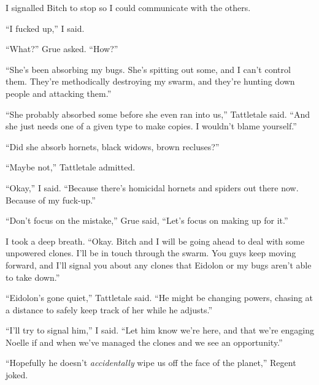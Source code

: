 





I signalled Bitch to stop so I could communicate with the others.



``I fucked up,'' I said.



``What?''  Grue asked.  ``How?''



``She's been absorbing my bugs.  She's spitting out some, and I can't control them.  They're methodically destroying my swarm, and they're hunting down people and attacking them.''



``She probably absorbed some before she even ran into us,'' Tattletale said.  ``And she just needs one of a given type to make copies.  I wouldn't blame yourself.''



``Did she absorb hornets, black widows, brown recluses?''



``Maybe not,'' Tattletale admitted.



``Okay,'' I said.  ``Because there's homicidal hornets and spiders out there now.  Because of my fuck-up.''



``Don't focus on the mistake,'' Grue said, ``Let's focus on making up for it.''



I took a deep breath.  ``Okay.  Bitch and I will be going ahead to deal with some unpowered clones.  I'll be in touch through the swarm.  You guys keep moving forward, and I'll signal you about any clones that Eidolon or my bugs aren't able to take down.''



``Eidolon's gone quiet,'' Tattletale said.  ``He might be changing powers, chasing at a distance to safely keep track of her while he adjusts.''



``I'll try to signal him,'' I said.  ``Let him know we're here, and that we're engaging Noelle if and when we've managed the clones and we see an opportunity.''



``Hopefully he doesn't \emph{accidentally} wipe us off the face of the planet,'' Regent joked.



